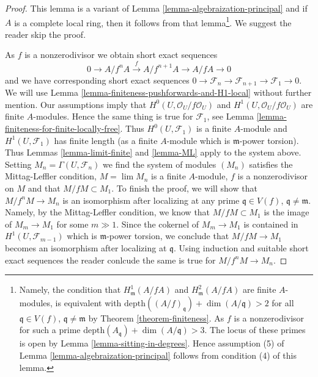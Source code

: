 \begin{proof}
This lemma is a variant of
Lemma \ref{lemma-algebraization-principal}
and if $A$ is a complete local ring, then it follows from that
lemma\footnote{Namely, the condition that
$H^1_\mathfrak m(A/fA)$ and $H^2_\mathfrak m(A/fA)$
are finite $A$-modules, is equivalent with
$\text{depth}((A/f)_\mathfrak q) + \dim(A/\mathfrak q) > 2$
for all $\mathfrak q \in V(f)$, $\mathfrak q \not = \mathfrak m$
by Theorem \ref{theorem-finiteness}. As $f$ is a nonzerodivisor
for such a prime
$\text{depth}(A_\mathfrak q) + \dim(A/\mathfrak q) > 3$. The locus
of these primes is open by Lemma \ref{lemma-sitting-in-degrees}.
Hence assumption (5) of Lemma \ref{lemma-algebraization-principal}
follows from condition (4) of this lemma.}.
We suggest the reader skip the proof.

\medskip\noindent
As $f$ is a nonzerodivisor we obtain short exact sequences
$$
0 \to A/f^nA \xrightarrow{f} A/f^{n + 1}A \to A/fA \to 0
$$
and we have corresponding short exact sequences
$0 \to \mathcal{F}_n \to \mathcal{F}_{n + 1} \to \mathcal{F}_1 \to 0$.
We will use Lemma \ref{lemma-finiteness-pushforwards-and-H1-local}
without further mention. Our assumptions imply that
$H^0(U, \mathcal{O}_U/f\mathcal{O}_U)$ and
$H^1(U, \mathcal{O}_U/f\mathcal{O}_U)$
are finite $A$-modules. Hence the same thing is true for $\mathcal{F}_1$, see
Lemma \ref{lemma-finiteness-for-finite-locally-free}.
Thus $H^0(U, \mathcal{F}_1)$ is a finite $A$-module
and $H^1(U, \mathcal{F}_1)$ has finite length
(as a finite $A$-module which is $\mathfrak m$-power torsion).
Thus Lemmas \ref{lemma-limit-finite} and
\ref{lemma-ML} apply to the system above. Setting
$M_n = \Gamma(U, \mathcal{F}_n)$ we find
the system of modules $(M_n)$ satisfies the Mittag-Leffler
condition, $M = \lim M_n$ is a finite $A$-module, $f$ is a
nonzerodivisor on $M$ and that $M/fM \subset M_1$. To finish the proof,
we will show that $M/f^nM \to M_n$ is an isomorphism after
localizing at any prime $\mathfrak q \in V(f)$,
$\mathfrak q \not = \mathfrak m$. Namely, by the Mittag-Leffler
condition, we know that $M/fM \subset M_1$ is the image of
$M_m \to M_1$ for some $m \gg 1$. Since the cokernel of
$M_m \to M_1$ is contained in $H^1(U, \mathcal{F}_{m -  1})$
which is $\mathfrak m$-power torsion, we conclude that
$M/fM \to M_1$ becomes an isomorphism after localizing at $\mathfrak q$.
Using induction and suitable short exact sequences the reader
conlcude the same is true for $M/f^n M \to M_n$.
\end{proof}















